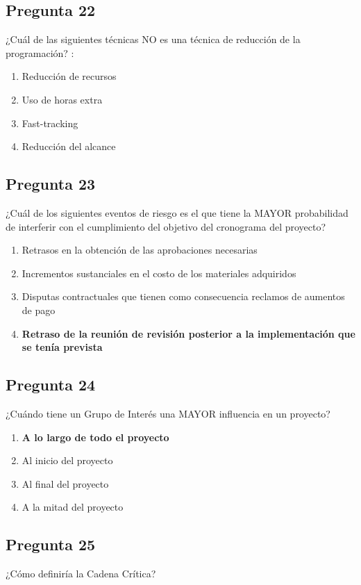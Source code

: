 \documentclass[11pt,a4paper]{article}
\begin{document}
\subsection*{Pregunta 22}
¿Cuál de las siguientes técnicas NO es una técnica de reducción de la programación? :

\begin{enumerate}[label=\alph*)]
  \item Reducción de recursos
  \item Uso de horas extra
  \item Fast-tracking
  \item Reducción del alcance
\end{enumerate}

\subsection*{Pregunta 23}
¿Cuál de los siguientes eventos de riesgo es el que tiene la MAYOR probabilidad de interferir con el cumplimiento del objetivo del cronograma del proyecto?

\begin{enumerate}[label=\alph*)]
  \item Retrasos en la obtención de las aprobaciones necesarias
  \item Incrementos sustanciales en el costo de los materiales adquiridos
  \item Disputas contractuales que tienen como consecuencia reclamos de aumentos de pago
  \item \textbf{Retraso de la reunión de revisión posterior a la implementación que se tenía prevista}
\end{enumerate}

\subsection*{Pregunta 24}
¿Cuándo tiene un Grupo de Interés una MAYOR influencia en un proyecto?

\begin{enumerate}[label=\alph*)]
  \item \textbf{A lo largo de todo el proyecto}
  \item Al inicio del proyecto
  \item Al final del proyecto
  \item A la mitad del proyecto
\end{enumerate}

\subsection*{Pregunta 25}
¿Cómo definiría la Cadena Crítica?
\end{document}
